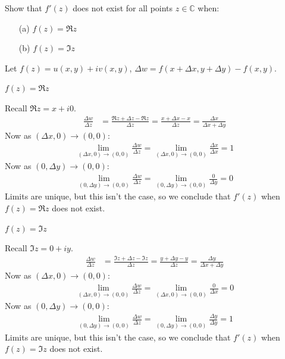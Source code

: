 \documentclass[12pt, english]{book}
\makeatletter
\renewenvironment{proof}[1][\proofname]{\par
	\pushQED{\qed}%
	\normalfont \topsep6\p@\@plus6\p@\relax
	\list{}{%
		\settowidth{\leftmargin}{\itshape\proofname:\hskip\labelsep}%
		\setlength{\labelwidth}{0pt}%
		\setlength{\itemindent}{-\leftmargin}%
	}%
	\item[\hskip\labelsep\itshape#1\@addpunct{:}]\ignorespaces
	}{ \popQED\endlist\@endpefalse}
\makeatother
\begin{document}
	\begin{example}
		Show that \(f'(z)\) does not exist for all points \(z \in \mathbb{C}\) when:
		\begin{itemize}
			\item[(a)] \(f(z) = \Re{z}\)
			\item[(b)] \(f(z) = \Im{z}\)
		\end{itemize}
		\begin{proof}
			{\color{Grey}
			Let \(f(z) = u(x,y) + iv(x,y)\), \(\Delta w = f(x+\Delta x, y + \Delta y) - f(x,y)\).
			
			\underline{\(f(z) = \Re{z}\)}
			
			Recall \(\Re{z} = x + i0\).
			\begin{align*}
				\frac{\Delta w}{\Delta z}
					&= \frac{\Re{z + \Delta z} - \Re{z}}{\Delta z} 
					 = \frac{x + \Delta x - x }{\Delta z} 
					 = \frac{\Delta x}{\Delta x + \Delta y}
			\end{align*}
			Now as \((\Delta x, 0) \rightarrow (0,0)\):
			\begin{align*}
				\lim_{(\Delta x, 0) \rightarrow (0,0)} \frac{\Delta w}{\Delta z} = \lim_{(\Delta x, 0) \rightarrow (0,0)} \frac{\Delta x}{\Delta x} = 1
			\end{align*} 
			Now as \((0, \Delta y) \rightarrow (0,0)\):
			\begin{align*}
				\lim_{(0, \Delta y) \rightarrow (0,0)} \frac{\Delta w}{\Delta z} = \lim_{(0,\Delta y) \rightarrow (0,0)} \frac{0}{\Delta y} = 0
			\end{align*}
			Limits are unique, but this isn't the case, so we conclude that \(f'(z)\) when \(f(z) = \Re{z}\) does not exist.
			
			\underline{\(f(z) = \Im{z}\)}
			
			Recall \(\Im{z} = 0 + iy\).
			\begin{align*}
				\frac{\Delta w}{\Delta z}
					&= \frac{\Im{z + \Delta z} - \Im{z} }{\Delta z}
					 = \frac{y + \Delta y - y}{\Delta z}
					 = \frac{\Delta y}{\Delta x + \Delta y}
			\end{align*}
			Now as \((\Delta x, 0) \rightarrow (0,0)\):
			\begin{align*}
				\lim_{(\Delta x, 0) \rightarrow (0,0)}  \frac{\Delta w}{\Delta z} = \lim_{(\Delta x, 0) \rightarrow (0,0)}  \frac{0}{\Delta x} = 0
			\end{align*} 
			Now as \((0, \Delta y) \rightarrow (0,0)\):
			\begin{align*}
				\lim_{(0,\Delta y) \rightarrow (0,0)} \frac{\Delta w}{\Delta z} = \lim_{(0,\Delta y) \rightarrow (0,0)} \frac{\Delta y}{\Delta y} = 1
			\end{align*}
			Limits are unique, but this isn't the case, so we conclude that \(f'(z)\) when \(f(z) = \Im{z}\) does not exist.
			}
		\end{proof}
	\end{example}
\end{document}
